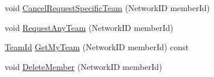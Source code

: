 \begin{DoxyCompactItemize}
\item 
void \hyperlink{class_rak_net_1_1_team_balancer_a03f15610ca6e59eacd83037908480e2b}{Cancel\-Request\-Specific\-Team} (Network\-I\-D member\-Id)
\item 
void \hyperlink{class_rak_net_1_1_team_balancer_a1b2f42019a0d7fd31598c9e043f818ed}{Request\-Any\-Team} (Network\-I\-D member\-Id)
\item 
\hyperlink{group___t_e_a_m___b_a_l_a_n_c_e_r___g_r_o_u_p_ga79c7825649955f28135498fb3d9f6894}{Team\-Id} \hyperlink{class_rak_net_1_1_team_balancer_afd1a578737b825716c648f791859676d}{Get\-My\-Team} (Network\-I\-D member\-Id) const 
\item 
void \hyperlink{class_rak_net_1_1_team_balancer_a8f114f374593f29eb92499a73ef40935}{Delete\-Member} (Network\-I\-D member\-Id)
\end{DoxyCompactItemize}
